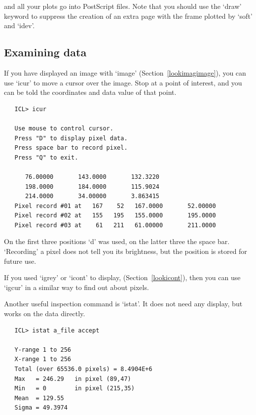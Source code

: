 \documentclass[11pt,twoside]{article}
\newcommand{\htmlref}[2]{#1}
\newcommand{\xlabel}[1]{}
\newcommand{\latorhtm}[2]{#1}
\newcommand{\latorhtm}[2]{#2}
\begin{document}
   and all your plots go into PostScript files. Note that you should use
   the `draw' keyword to suppress the creation of an extra page with the
   frame plotted by `soft' and `idev'.


\subsection{\xlabel{examine}\label{examine}Examining data}

   If you have
   \latorhtm{displayed an image with `image' (Section~\ref{lookimagimage}),}
   {\htmlref{displayed an image with `image',}{lookimagimage}}
   you can use `icur' to move a cursor over the image. Stop at a point
   of interest, and you can be told the coordinates and data value of
   that point.

\begin{verbatim}
   ICL> icur

   Use mouse to control cursor.
   Press "D" to display pixel data.
   Press space bar to record pixel.
   Press "Q" to exit.

      76.00000       143.0000       132.3220
      198.0000       184.0000       115.9024
      214.0000       34.00000       3.863415
   Pixel record #01 at   167    52   167.0000       52.00000
   Pixel record #02 at   155   195   155.0000       195.0000
   Pixel record #03 at    61   211   61.00000       211.0000
\end{verbatim}

   On the first three positions `d' was used, on the latter three the
   space bar. `Recording' a pixel does not tell you its brightness, but
   the position is stored for future use.

   If you
   \latorhtm{used `igrey' or `icont' to display, (Section~\ref{lookicont}),}
   {\htmlref{used `igrey' or `icont' to display,}{lookicont}}
   then you can use `igcur' in a similar way to find out about pixels.

   Another useful inspection command is `istat'. It does not need any
   display, but works on the data directly.

\begin{verbatim}
   ICL> istat a_file accept

   Y-range 1 to 256
   X-range 1 to 256
   Total (over 65536.0 pixels) = 8.4904E+6
   Max   = 246.29   in pixel (89,47)
   Min   = 0        in pixel (215,35)
   Mean  = 129.55
   Sigma = 49.3974
\end{verbatim}
\end{document}
